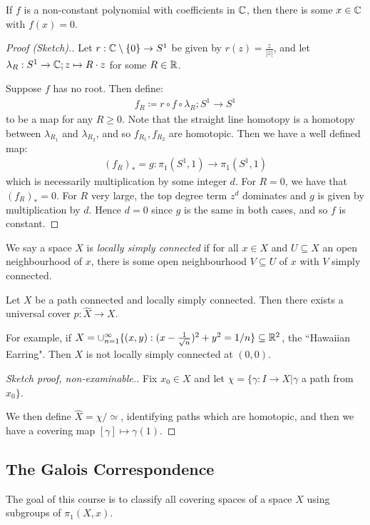 \documentclass[10pt,a4paper]{article}
\begin{document}
\begin{theorem}
If $f$ is a non-constant polynomial with coefficients in $\mathbb{C}$, then there is some $x \in \mathbb{C}$ with $f(x) = 0$.
\end{theorem}
\begin{proof}[Proof (Sketch).]
Let $r : \mathbb{C}\setminus \{0\} \to S^1$ be given by $r(z) = \frac{z}{|z|}$, and let $\lambda_R:S^1 \to \mathbb{C}; z\mapsto R\cdot z$ for some $R \in \mathbb{R}$. 

Suppose $f$ has no root. Then define:
\begin{align*}
f_R \coloneqq r\circ f \circ \lambda_R; S^1 \to S^1
\end{align*}
to be a map for any $R \geq 0$. Note that the straight line homotopy is a homotopy between $\lambda_{R_1}$ and $\lambda_{R_2}$, and so $f_{R_1}, f_{R_2}$ are homotopic. Then we have a well defined map:
\begin{align*}
(f_R)_\ast = g : \pi_1(S^1, 1) \to \pi_1(S^1, 1)
\end{align*}
which is necessarily multiplication by some integer $d$. For $R = 0$, we have that $(f_R)_\ast = 0$. For $R$ very large, the top degree term $z^d$ dominates and $g$ is given by multiplication by $d$. Hence $d=0$ since $g$ is the same in both cases, and so $f$ is constant.
\end{proof}

We say a space $X$ is \emph{locally simply connected} if for all $x\in X$ and $U \subseteq X$ an open neighbourhood of $x$, there is some open neighbourhood $V \subseteq U$ of $x$ with $V$ simply connected.
\begin{theorem}
Let $X$ be a path connected and locally simply connected. Then there exists a universal cover $p:\hat{X} \to X$.
\end{theorem}
For example, if $X = \cup_{n=1}^\infty \{(x,y) : (x-\frac{1}{\sqrt{n}})^2 + y^2 = 1/n\} \subseteq \mathbb{R}^2$, the ``Hawaiian Earring". Then $X$ is not locally simply connected at $(0,0)$.

\begin{proof}[Sketch proof, non-examinable.]
Fix $x_0 \in X$ and let $\chi = \{\gamma:I \to X | \gamma$ a path from $x_0\}$.

We then define $\hat{X} = \chi/\simeq$, identifying paths which are homotopic, and then we have a covering map $[\gamma] \mapsto \gamma(1)$.
\end{proof}

\subsection*{The Galois Correspondence}
The goal of this course is to classify all covering spaces of a space $X$ using subgroups of $\pi_1(X,x)$.
\end{document}

